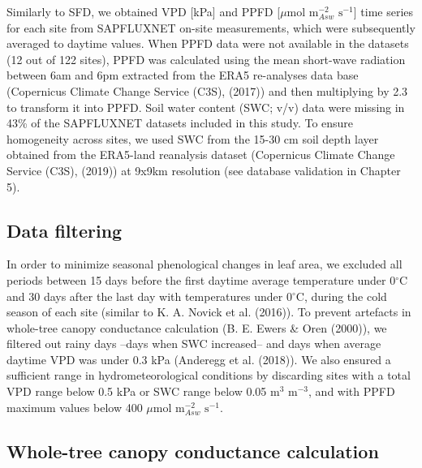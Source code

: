 \documentclass[11pt,twoside]{reedthesis}
\begin{document}
Similarly to SFD, we obtained VPD {[}kPa{]} and PPFD {[}\(\mu\)mol
\(\text{m}^{-2}_{Asw}\) \(\text{s}^{-1}\){]} time series for each site
from SAPFLUXNET on-site measurements, which were subsequently averaged
to daytime values. When PPFD data were not available in the datasets (12
out of 122 sites), PPFD was calculated using the mean short-wave
radiation between 6am and 6pm extracted from the ERA5 re-analyses data
base (Copernicus Climate Change Service (C3S), (2017)) and then
multiplying by 2.3 to transform it into PPFD. Soil water content (SWC;
v/v) data were missing in 43\% of the SAPFLUXNET datasets included in
this study. To ensure homogeneity across sites, we used SWC from the
15-30 cm soil depth layer obtained from the ERA5-land reanalysis dataset
(Copernicus Climate Change Service (C3S), (2019)) at 9x9km resolution
(see database validation in Chapter 5).\par

\subsection{Data filtering}\label{data-filtering}

In order to minimize seasonal phenological changes in leaf area, we
excluded all periods between 15 days before the first daytime average
temperature under 0\(^{\circ}\)C and 30 days after the last day with
temperatures under 0\(^{\circ}\)C, during the cold season of each site
(similar to K. A. Novick et al. (2016)). To prevent artefacts in
whole-tree canopy conductance calculation (B. E. Ewers \& Oren (2000)),
we filtered out rainy days --days when SWC increased-- and days when
average daytime VPD was under 0.3 kPa (Anderegg et al. (2018)). We also
ensured a sufficient range in hydrometeorological conditions by
discarding sites with a total VPD range below 0.5 kPa or SWC range below
0.05 \(\text{m}^{3}\) \(\text{m}^{-3}\), and with PPFD maximum values
below 400 \(\mu\)mol \(\text{m}^{-2}_{Asw}\) \(\text{s}^{-1}\).\par

\subsection{Whole-tree canopy conductance
calculation}\label{whole-tree-canopy-conductance-calculation}
\end{document}
